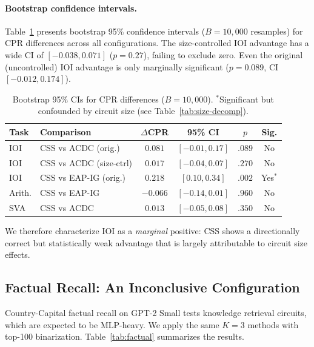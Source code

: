 \documentclass[11pt,a4paper]{article}
\newcommand{\css}{\textsc{CSS}}
\newcommand{\cpr}{\textsc{CPR}}
\begin{document}
\paragraph{Bootstrap confidence intervals.}
Table~\ref{tab:bootstrap} presents bootstrap 95\% confidence intervals ($B=10{,}000$ resamples) for \cpr{} differences across all configurations. The size-controlled IOI advantage has a wide CI of $[-0.038, 0.071]$ ($p=0.27$), failing to exclude zero. Even the original (uncontrolled) IOI advantage is only marginally significant ($p=0.089$, CI $[-0.012, 0.174]$).

\begin{table}[t]
\centering
\small
\begin{tabular}{llcccc}
\toprule
\textbf{Task} & \textbf{Comparison} & \textbf{$\Delta$\cpr{}} & \textbf{95\% CI} & \textbf{$p$} & \textbf{Sig.} \\
\midrule
IOI & CSS vs ACDC (orig.) & $0.081$ & $[-0.01, 0.17]$ & $.089$ & No \\
IOI & CSS vs ACDC (size-ctrl) & $0.017$ & $[-0.04, 0.07]$ & $.270$ & No \\
IOI & CSS vs EAP-IG (orig.) & $0.218$ & $[0.10, 0.34]$ & $.002$ & Yes$^*$ \\
Arith. & CSS vs EAP-IG & $-0.066$ & $[-0.14, 0.01]$ & $.960$ & No \\
SVA & CSS vs ACDC & $0.013$ & $[-0.05, 0.08]$ & $.350$ & No \\
\bottomrule
\end{tabular}
\caption{Bootstrap 95\% CIs for \cpr{} differences ($B=10{,}000$). $^*$Significant but confounded by circuit size (see Table~\ref{tab:size-decomp}).}
\label{tab:bootstrap}
\end{table}

We therefore characterize IOI as a \emph{marginal} positive: \css{} shows a directionally correct but statistically weak advantage that is largely attributable to circuit size effects.

\subsection{Factual Recall: An Inconclusive Configuration}
\label{sec:factual}

Country-Capital factual recall on GPT-2 Small tests knowledge retrieval circuits, which are expected to be MLP-heavy. We apply the same $K=3$ methods with top-100 binarization. Table~\ref{tab:factual} summarizes the results.
\end{document}
